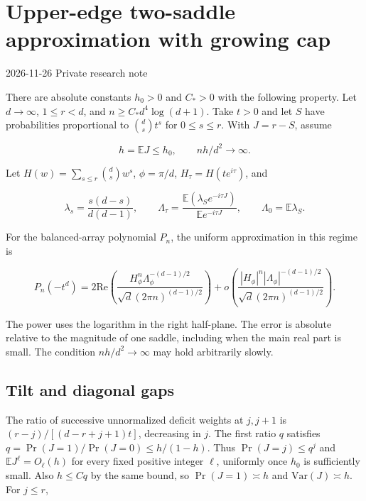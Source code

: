 \section{Upper-edge two-saddle approximation with growing cap}\label{sec:growing-cap-upper-saddle}

2026-11-26 \enspace Private research note

There are absolute constants $h_0>0$ and $C_*>0$ with the following property. Let $d\to\infty$, $1\le r<d$, and $n\ge C_*d^4\log(d+1)$. Take $t>0$ and let $S$ have probabilities proportional to $\binom ds t^s$ for $0\le s\le r$. With $J=r-S$, assume

\begin{equation*}
h=\mathbb E J\le h_0,\qquad nh/d^2\longrightarrow\infty.
\end{equation*}

Let $H(w)=\sum_{s\le r}\binom ds w^s$, $\phi=\pi/d$, $H_\tau=H(te^{i\tau})$, and

\begin{equation*}
\lambda_s=\frac{s(d-s)}{d(d-1)},\qquad
\Lambda_\tau=\frac{\mathbb E(\lambda_S e^{-i\tau J})}{\mathbb E e^{-i\tau J}},
\qquad \Lambda_0=\mathbb E\lambda_S.
\end{equation*}

For the balanced-array polynomial $P_n$, the uniform approximation in this regime is

\begin{equation}
P_n(-t^d)=2\mathrm{Re}\left(
 \frac{H_\phi^n \Lambda_\phi^{-(d-1)/2}}{\sqrt d(2\pi n)^{(d-1)/2}}
 \right)
 +o\left(\frac{|H_\phi|^n|\Lambda_\phi|^{-(d-1)/2}}{\sqrt d(2\pi n)^{(d-1)/2}}\right).
\tag{S1}
\end{equation}

The power uses the logarithm in the right half-plane. The error is absolute relative to the magnitude of one saddle, including when the main real part is small. The condition $nh/d^2\to\infty$ may hold arbitrarily slowly.

\subsection{Tilt and diagonal gaps}

The ratio of successive unnormalized deficit weights at $j,j+1$ is $(r-j)/[(d-r+j+1)t]$, decreasing in $j$. The first ratio $q$ satisfies $q=\Pr(J=1)/\Pr(J=0)\le h/(1-h)$. Thus $\Pr(J=j)\le q^j$ and $\mathbb E J^\ell=O_\ell(h)$ for every fixed positive integer $\ell$, uniformly once $h_0$ is sufficiently small. Also $h\le Cq$ by the same bound, so $\Pr(J=1)\asymp h$ and $\mathrm{Var}(J)\asymp h$. For $j\le r$,


